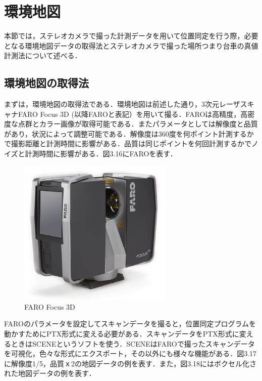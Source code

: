 
\section{環境地図}
本節では，ステレオカメラで撮った計測データを用いて位置同定を行う際，必要となる環境地図データの取得法とステレオカメラで撮った場所つまり台車の真値計測法について述べる．

\subsection{環境地図の取得法}
まずは，環境地図の取得法である．環境地図は前述した通り，3次元レーザスキャナFARO Focus 3D (以降FAROと表記）を用いて撮る．FAROは高精度，高密度な点群とカラー画像が取得可能である．またパラメータとしては解像度と品質があり，状況によって調整可能である．解像度は360度を何ポイント計測するかで撮影距離と計測時間に影響がある．品質は同じポイントを何回計測するかでノイズと計測時間に影響がある．図3.16にFAROを表す．

\begin{figure}[htbp]
  \begin{center}
   \includegraphics[height=70mm]{figure/FARO.eps}
   \caption{FARO Focus 3D}
   \label{FARO}
  \end{center}
\end{figure}

FAROのパラメータを設定してスキャンデータを撮ると，位置同定プログラムを動かすためにPTX形式に変える必要がある．スキャンデータをPTX形式に変えるときはSCENEというソフトを使う．SCENEはFAROで撮ったスキャンデータを可視化，色々な形式にエクスポート，その以外にも様々な機能がある．図3.17に解像度1/5，品質ｘ2の地図データの例を表す．また，図3.18にはボクセル化された地図データの例を表す．

